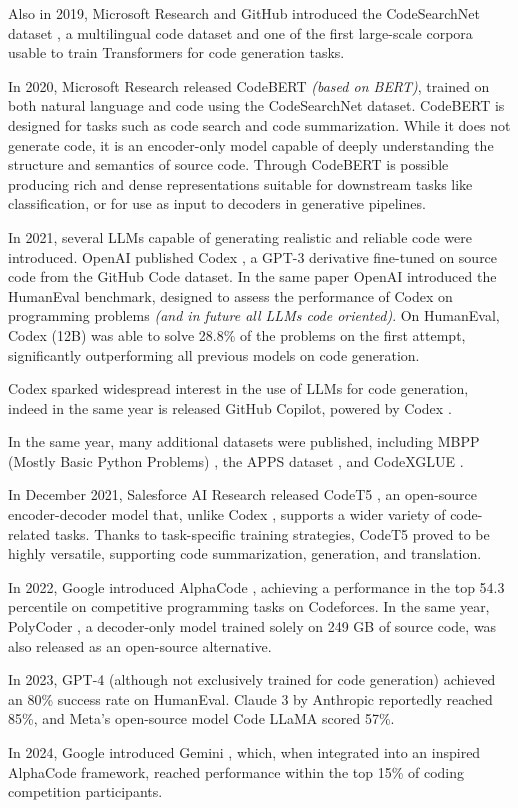Also in 2019, Microsoft Research and GitHub introduced the 
CodeSearchNet dataset \cite{husain2019codesearchnet}, a 
multilingual code dataset and one of the first large-scale 
corpora usable to train Transformers for code generation tasks.

In 2020, Microsoft Research released CodeBERT 
\cite{feng2020codebert} \textit{(based on BERT)}, 
trained on both natural 
language and code using the CodeSearchNet dataset. 
CodeBERT is designed for tasks such as code search 
and code summarization. While it does not generate code, 
it is an encoder-only model capable of deeply understanding 
the structure and semantics of source code. Through 
CodeBERT is possible producing rich 
and dense representations suitable for downstream tasks like 
classification, or for use as input to decoders in generative 
pipelines.

In 2021, several LLMs capable of generating realistic and 
reliable code were introduced. OpenAI published Codex 
\cite{chen2021codex}, a GPT-3 \cite{brown2020language} derivative fine-tuned on 
source code from the GitHub Code dataset. In the same paper 
OpenAI introduced the HumanEval benchmark, designed to assess the 
performance of Codex \cite{chen2021codex} on programming problems 
\textit{(and in future all LLMs code oriented)}.
On HumanEval, Codex (12B) was able to solve 28.8\% 
of the problems on the 
first attempt, significantly outperforming all previous 
models on code generation.

Codex \cite{chen2021codex} sparked widespread interest in the use of LLMs 
for code generation, indeed in the same year is released 
GitHub Copilot, powered by Codex \cite{chen2021codex}.

In the same year, 
many additional datasets were 
published, including MBPP (Mostly Basic Python Problems) 
\cite{austin2021program}, the APPS dataset \cite{hendrycks2021measuring}, 
and CodeXGLUE \cite{lu2021codexglue}.

In December 2021, Salesforce AI Research released CodeT5 
\cite{wang2021codet5}, an open-source encoder-decoder 
model that, unlike Codex \cite{chen2021codex}, supports a wider variety of 
code-related tasks. Thanks to task-specific training strategies, 
CodeT5 proved to be highly versatile, supporting code 
summarization, generation, and translation.

In 2022, Google introduced AlphaCode \cite{li2022competition}, 
achieving a performance in the top 54.3 percentile on 
competitive programming tasks on Codeforces. In the same 
year, PolyCoder \cite{xu2022systematic}, a decoder-only 
model trained solely on 249 GB of source code, was also 
released as an open-source alternative. 

In 2023, GPT-4 \cite{openai2023gpt4} (although not 
exclusively trained for code generation)  
achieved an 80\% success rate on HumanEval. 
Claude 3 by Anthropic reportedly reached 85\%, 
and Meta’s open-source model Code LLaMA 
\cite{roziere2023code} scored 57\%.

In 2024, Google introduced Gemini \cite{AlphaCode_2}, 
which, when integrated into an inspired AlphaCode framework, 
reached performance within the top 15\% of coding competition 
participants.
